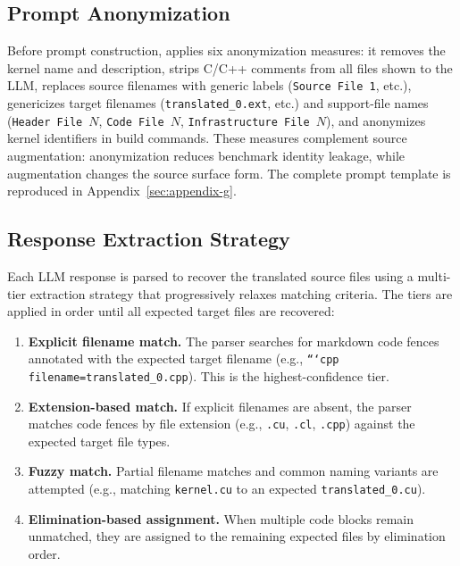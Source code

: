 \subsection{Prompt Anonymization}
\label{sec:appendix-a-anonymization}

Before prompt construction, \parbench{} applies six anonymization measures: it removes the kernel name and description, strips C/C++ comments from all files shown to the LLM, replaces source filenames with generic labels (\texttt{Source File~1}, etc.), genericizes target filenames (\texttt{translated\_0.ext}, etc.) and support-file names (\texttt{Header File~$N$}, \texttt{Code File~$N$}, \texttt{Infrastructure File~$N$}), and anonymizes kernel identifiers in build commands. These measures complement source augmentation: anonymization reduces benchmark identity leakage, while augmentation changes the source surface form. The complete prompt template is reproduced in Appendix~\ref{sec:appendix-g}.


\subsection{Response Extraction Strategy}
\label{sec:appendix-a-extraction}

Each LLM response is parsed to recover the translated source files using a multi-tier extraction strategy that progressively relaxes matching criteria. The tiers are applied in order until all expected target files are recovered:

\begin{enumerate}
    \item \textbf{Explicit filename match.} The parser searches for markdown code fences annotated with the expected target filename (e.g., \texttt{```cpp filename=translated\_0.cpp}). This is the highest-confidence tier.
    \item \textbf{Extension-based match.} If explicit filenames are absent, the parser matches code fences by file extension (e.g., \texttt{.cu}, \texttt{.cl}, \texttt{.cpp}) against the expected target file types.
    \item \textbf{Fuzzy match.} Partial filename matches and common naming variants are attempted (e.g., matching \texttt{kernel.cu} to an expected \texttt{translated\_0.cu}).
    \item \textbf{Elimination-based assignment.} When multiple code blocks remain unmatched, they are assigned to the remaining expected files by elimination order.
\end{enumerate}


